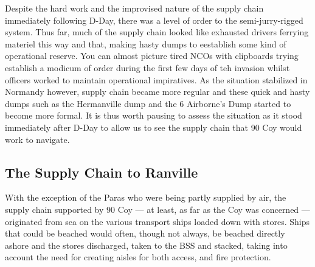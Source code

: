 \documentclass[noraggedright]{turabian-researchpaper}
\begin{document}
Despite the hard work and the improvised nature of the supply chain 
immediately following D-Day, there was a level of order to the 
semi-jurry-rigged system.  Thus far, much of the supply chain looked like
exhausted drivers ferrying materiel this way and that, making hasty dumps
to eestablish some kind of operational reserve.  You can almost picture tired
NCOs with clipboards trying establish a modicum of order during the first
few days of teh invasion whilst officers worked to maintain operational 
impiratives.  As the situation stabilized in Normandy however, supply chain 
became more regular and these quick and hasty dumps such as the 
Hermanville dump and the 6 Airborne's Dump started to become more formal.  It 
is thus worth pausing to assess the situation as it stood immediately after 
D-Day to allow us to see the supply chain that 90 Coy would work to navigate.

\subsection{The Supply Chain to Ranville}

With the exception of the Paras who were being partly supplied by air, the
supply chain supported by 90 Coy --- at least, as far as the Coy was concerned
--- originated from sea on the various transport ships loaded down with 
stores.  Ships that could be beached would often, though not always, be 
beached directly ashore and the stores discharged, taken to the BSS and 
stacked, taking into account the need for creating aisles for both access, 
and fire protection.  
\end{document}
